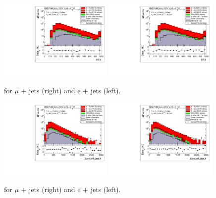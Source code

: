 \begin{figure}[!ht]
    \includegraphics[clip, trim=0.15cm 0.15cm 0.15cm 0.1cm, width=0.49\textwidth]{images/Run1/HTX_StackLogY_Mu.pdf}
    \includegraphics[clip, trim=0.15cm 0.15cm 0.15cm 0.1cm, width=0.49\textwidth]{images/Run1/HTX_StackLogY_e.pdf}
    \caption{\HTX for $\mu$ + jets (right) and e + jets (left).}
    \label{fig:HTX}
\end{figure}

\begin{figure}[!ht]
    \includegraphics[clip, trim=0.15cm 0.15cm 0.15cm 0.1cm, width=0.49\textwidth]{images/Run1/SumJetMassX_StackLogY_Mu.pdf}
    \includegraphics[clip, trim=0.15cm 0.15cm 0.15cm 0.1cm, width=0.49\textwidth]{images/Run1/SumJetMassX_StackLogY_e.pdf}
    \caption{\sumjetmassX for $\mu$ + jets (right) and e + jets (left).}
    \label{fig:sumjetmassX}
\end{figure}

